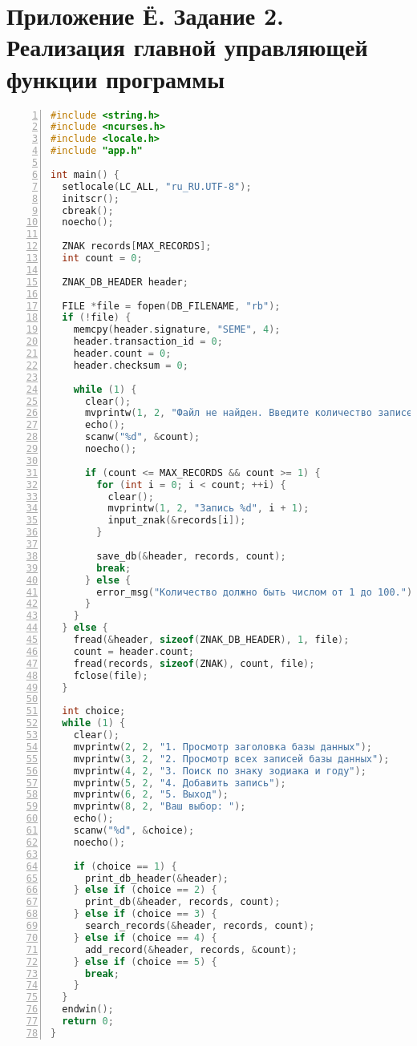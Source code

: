 \section*{Приложение Ё. Задание 2. Реализация главной управляющей функции программы}

\begin{lstlisting}[language=C,numbers=left]
#include <string.h>
#include <ncurses.h>
#include <locale.h>
#include "app.h"

int main() {
  setlocale(LC_ALL, "ru_RU.UTF-8");
  initscr();
  cbreak();
  noecho();

  ZNAK records[MAX_RECORDS];
  int count = 0;

  ZNAK_DB_HEADER header;

  FILE *file = fopen(DB_FILENAME, "rb");
  if (!file) {
    memcpy(header.signature, "SEME", 4);
    header.transaction_id = 0;
    header.count = 0;
    header.checksum = 0;

    while (1) {
      clear();
      mvprintw(1, 2, "Файл не найден. Введите количество записей: ");
      echo();
      scanw("%d", &count);
      noecho();

      if (count <= MAX_RECORDS && count >= 1) {
        for (int i = 0; i < count; ++i) {
          clear();
          mvprintw(1, 2, "Запись %d", i + 1);
          input_znak(&records[i]);
        }

        save_db(&header, records, count);
        break;
      } else {
        error_msg("Количество должно быть числом от 1 до 100.");
      }
    }
  } else {
    fread(&header, sizeof(ZNAK_DB_HEADER), 1, file);
    count = header.count;
    fread(records, sizeof(ZNAK), count, file);
    fclose(file);
  }

  int choice;
  while (1) {
    clear();
    mvprintw(2, 2, "1. Просмотр заголовка базы данных");
    mvprintw(3, 2, "2. Просмотр всех записей базы данных");
    mvprintw(4, 2, "3. Поиск по знаку зодиака и году");
    mvprintw(5, 2, "4. Добавить запись");
    mvprintw(6, 2, "5. Выход");
    mvprintw(8, 2, "Ваш выбор: ");
    echo();
    scanw("%d", &choice);
    noecho();

    if (choice == 1) {
      print_db_header(&header);
    } else if (choice == 2) {
      print_db(&header, records, count);
    } else if (choice == 3) {
      search_records(&header, records, count);
    } else if (choice == 4) {
      add_record(&header, records, &count);
    } else if (choice == 5) {
      break;
    }
  }
  endwin();
  return 0;
}
\end{lstlisting}